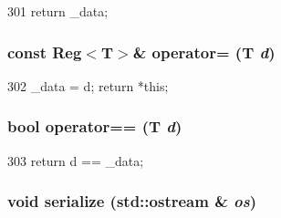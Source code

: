 \begin{DoxyCode}
301 { return _data; }
\end{DoxyCode}
\hypertarget{structiGbReg_1_1Regs_1_1Reg_ae79c18c14f560a6d39b4111ac120b702}{
\subsubsection[{operator=}]{\setlength{\rightskip}{0pt plus 5cm}const {\bf Reg}$<$T$>$\& operator= (T {\em d})}}
\label{structiGbReg_1_1Regs_1_1Reg_ae79c18c14f560a6d39b4111ac120b702}



\begin{DoxyCode}
302 { _data = d; return *this;}
\end{DoxyCode}
\hypertarget{structiGbReg_1_1Regs_1_1Reg_a784db2d8753913b11cdf46eae9c2e6a5}{
\subsubsection[{operator==}]{\setlength{\rightskip}{0pt plus 5cm}bool operator== (T {\em d})}}
\label{structiGbReg_1_1Regs_1_1Reg_a784db2d8753913b11cdf46eae9c2e6a5}



\begin{DoxyCode}
303 { return d == _data; }
\end{DoxyCode}
\hypertarget{structiGbReg_1_1Regs_1_1Reg_a53e036786d17361be4c7320d39c99b84}{
\subsubsection[{serialize}]{\setlength{\rightskip}{0pt plus 5cm}void serialize (std::ostream \& {\em os})}}
\label{structiGbReg_1_1Regs_1_1Reg_a53e036786d17361be4c7320d39c99b84}



